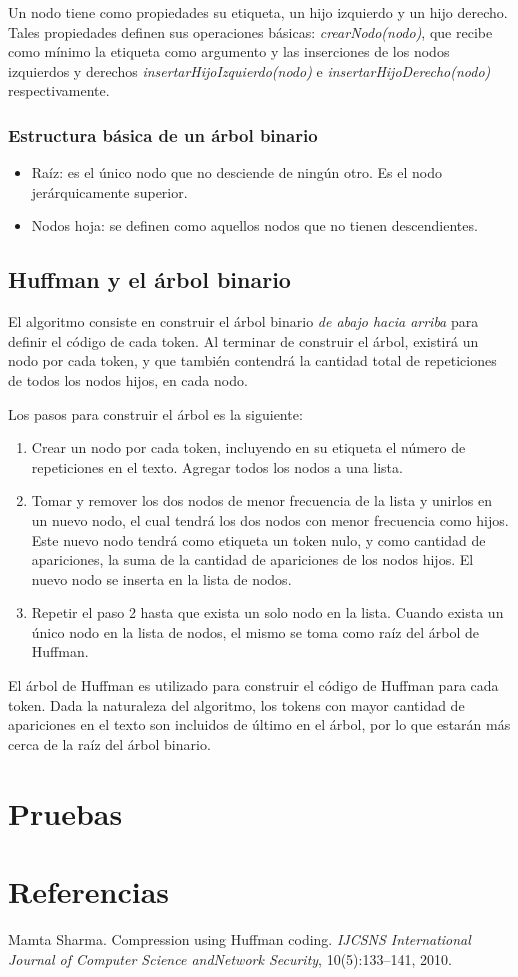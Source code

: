 \documentclass{IEEEtran}
\begin{document}
Un nodo tiene como propiedades su etiqueta, un hijo izquierdo y un hijo derecho. Tales propiedades definen sus operaciones b\'asicas: \emph{crearNodo(nodo)}, que recibe como m\'inimo la etiqueta como argumento y las inserciones de los nodos izquierdos y derechos \emph{insertarHijoIzquierdo(nodo)} e \emph{insertarHijoDerecho(nodo)} respectivamente.

\subsubsection{Estructura b\'asica de un \'arbol binario}
\begin{itemize}
  \item Ra\'iz: es el \'unico nodo que no desciende de ning\'un otro. Es el nodo jer\'arquicamente superior.
  \item Nodos hoja: se definen como aquellos nodos que no tienen descendientes.
\end{itemize}

\subsection{Huffman y el \'arbol binario}
El algoritmo consiste en construir el \'arbol binario \emph{de abajo hacia arriba} para definir el c\'odigo de cada token. Al terminar de construir el \'arbol, existir\'a un nodo por cada token, y que tambi\'en contendr\'a la cantidad total de repeticiones de todos los nodos hijos, en cada nodo.

Los pasos para construir el \'arbol es la siguiente:
\begin{enumerate}
  \item Crear un nodo por cada token, incluyendo en su etiqueta el n\'umero de repeticiones en el texto. Agregar todos los nodos a una lista.
  \item Tomar y remover los dos nodos de menor frecuencia de la lista y unirlos en un nuevo nodo, el cual tendr\'a los dos nodos con menor frecuencia como hijos. Este nuevo nodo tendr\'a como etiqueta un token nulo, y como cantidad de apariciones, la suma de la cantidad de apariciones de los nodos hijos. El nuevo nodo se inserta en la lista de nodos.
  \item Repetir el paso 2 hasta que exista un solo nodo en la lista. Cuando exista un \'unico nodo en la lista de nodos, el mismo se toma como ra\'iz del \'arbol de Huffman.
\end{enumerate}

El \'arbol de Huffman es utilizado para construir el c\'odigo de Huffman para cada token. Dada la naturaleza del algoritmo, los tokens con mayor cantidad de apariciones en el texto son incluidos de \'ultimo en el \'arbol, por lo que estar\'an m\'as cerca de la ra\'iz del \'arbol binario.

\section{Pruebas}

\section{Referencias}

\begin{thebibliography}{99}

 Mamta  Sharma.   Compression  using  Huffman  coding. \emph{IJCSNS International Journal of Computer Science andNetwork Security}, 10(5):133–141, 2010.
\end{thebibliography}
\end{document}
